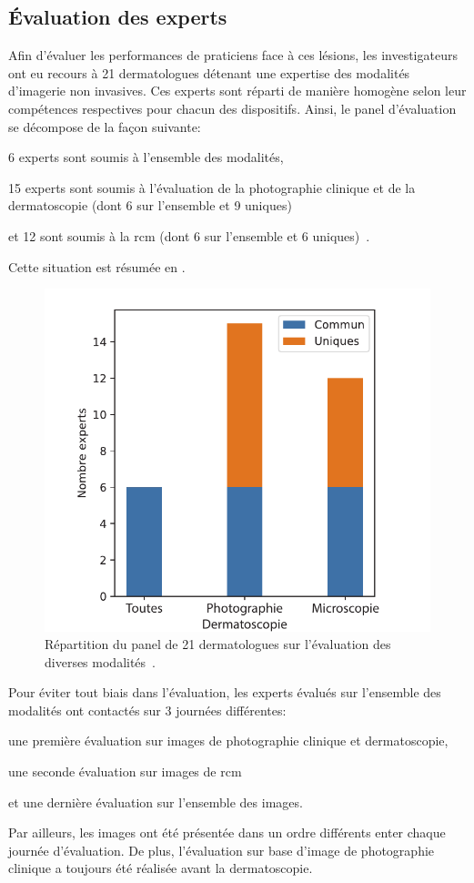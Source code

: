 \addtocounter{footnote}{1}
\addtocounter{footnote}{1}
\addtocounter{footnote}{1}

\subsection{Évaluation des experts}
Afin d'évaluer les performances de praticiens face à ces lésions, les investigateurs ont eu recours à 21 dermatologues détenant une expertise des modalités d'imagerie non invasives. Ces experts sont réparti de manière homogène selon leur compétences respectives pour chacun des dispositifs. Ainsi, le panel d'évaluation se décompose de la façon suivante: 
\begin{inenum}
\item 6 experts sont soumis à l'ensemble des modalités,
\item 15 experts sont soumis à l'évaluation de la photographie clinique et de la dermatoscopie (dont 6 sur l'ensemble et 9 uniques)
\item et 12 sont soumis à la \gls{rcm} (dont 6 sur l'ensemble et 6 uniques)~\cite{Cinotti2018}.
\end{inenum}
Cette situation est résumée en .
\begin{figure}[H]
    \centering
    \includegraphics[width=0.4\linewidth]{contents/chapter_2/resources/experts_evaluation.pdf}
    \caption{Répartition du panel de 21 dermatologues sur l'évaluation des diverses modalités~\cite{Cinotti2018}.}
    \label{fig:experts_evaluation}
\end{figure}\par
Pour éviter tout biais dans l'évaluation, les experts évalués sur l'ensemble des modalités ont contactés sur 3 journées différentes: 
\begin{inenum}
\item une première évaluation sur images de photographie clinique et dermatoscopie,
\item une seconde évaluation sur images de \gls{rcm}
\item et une dernière évaluation sur l'ensemble des images.
\end{inenum}
Par ailleurs, les images ont été présentée dans un ordre différents enter chaque journée d'évaluation. De plus, l'évaluation sur base d'image de photographie clinique a toujours été réalisée avant la dermatoscopie.\par

